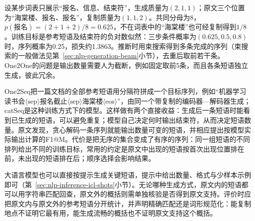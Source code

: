 设某步词表只展示“报名、信息、结束符”，生成质量为$(2,1,1)$；原文三个位置为“海棠楼、报名、报名”，复制质量为$(1,1,2)$。共同分母为8，$p(\text{报名})=(2+1+2)/8=0.625$，不在词表中的“海棠楼”也可经复制得到$1/8$。训练目标是参考短语及结束符的负对数似然：三步条件概率为$(0.625,0.5,0.8)$时，序列概率为0.25，损失约1.3863。推断时用束搜索得到多条完成的序列（束搜索的一般做法见第~\ref{sec:nlp-generation-beam}小节），去重后取前若干条。One2One的问题是输出数量需要人为截断，例如固定取前5条，而且各条短语独立生成，彼此冗余。

One2Seq把一篇文档的全部参考短语用分隔符拼成一个目标序列，例如“机器学习读书会$\langle\mathrm{sep}\rangle$报名截止$\langle\mathrm{sep}\rangle$海棠楼$\langle\mathrm{eos}\rangle$”，由同一个带复制的编码器—解码器生成；catSeq是这种训练方式下的模型。这样做有两个直接收益：生成后一条短语时能看到已生成的短语，可以避免重复；模型自己决定何时输出结束符，从而决定短语数量。原文发现，贪心解码一条序列就能输出数量可变的短语，并相应提出按模型实际输出计算的F1@M。代价是把无序的集合变成了有序的序列：同一组短语的不同排列给出不同的训练目标，常用的约定是原文中出现的短语按首次出现位置排在前，未出现的短语排在后；顺序选择会影响结果。

大语言模型也可以直接按提示生成关键短语，提示中给出数量、格式与少样本示例即可（第~\ref{sec:nlp-inference-icl-shots}小节）。无论哪种生成方式，原文内的短语都可以用字符串匹配回查，原文外的概括则需单独核验是否得到原文支持。评价时应把原文内与原文外的参考短语分开统计，并声明精确匹配还是词形规范化：能复制地点不证明它最有用，能生成流畅的概括也不证明原文支持这个概括。
